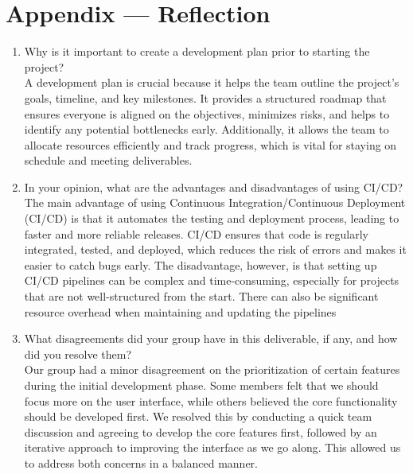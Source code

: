 \documentclass{article}
\begin{document}
\newpage{}

\section*{Appendix --- Reflection}



\begin{enumerate}
    \item Why is it important to create a development plan prior to starting the
    project?\\
    A development plan is crucial because it helps the team outline the project’s
    goals, timeline, and key milestones. It provides a structured roadmap that
    ensures everyone is aligned on the objectives, minimizes risks, and helps
    to identify any potential bottlenecks early. Additionally, it allows the team
    to allocate resources efficiently and track progress, which is vital for staying
    on schedule and meeting deliverables.

    \item In your opinion, what are the advantages and disadvantages of using
    CI/CD?\\
    The main advantage of using Continuous Integration/Continuous Deployment (CI/CD)
    is that it automates the testing and deployment process, leading to faster and 
    more reliable releases. CI/CD ensures that code is regularly integrated, tested,
    and deployed, which reduces the risk of errors and makes it easier to catch bugs early. 
    The disadvantage, however, is that setting up CI/CD pipelines can be complex and 
    time-consuming, especially for projects that are not well-structured from the start. 
    There can also be significant resource overhead when maintaining and updating the pipelines

    \item What disagreements did your group have in this deliverable, if any,
    and how did you resolve them?\\
    Our group had a minor disagreement on the prioritization of certain features during 
    the initial development phase. Some members felt that we should focus more on the 
    user interface, while others believed the core functionality should be developed first.
    We resolved this by conducting a quick team discussion and agreeing to develop the core
    features first, followed by an iterative approach to improving the interface as we go along.
     This allowed us to address both concerns in a balanced manner.
\end{enumerate}
\end{document}
